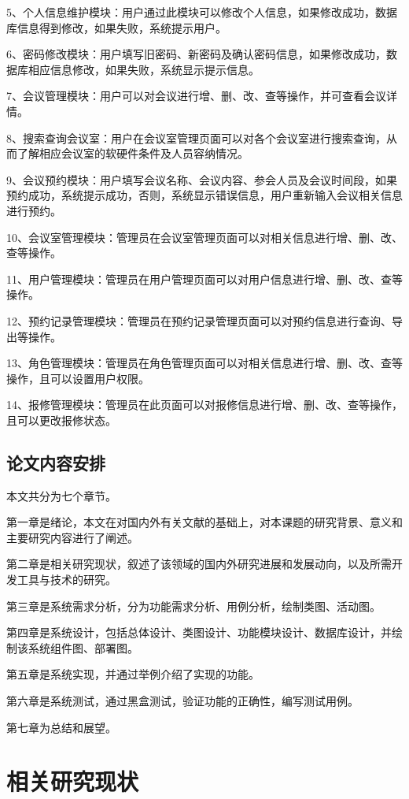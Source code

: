 \documentclass{izdthesis}
\begin{document}
5、个人信息维护模块：用户通过此模块可以修改个人信息，如果修改成功，数据库信息得到修改，如果失败，系统提示用户。

6、密码修改模块：用户填写旧密码、新密码及确认密码信息，如果修改成功，数据库相应信息修改，如果失败，系统显示提示信息。

7、会议管理模块：用户可以对会议进行增、删、改、查等操作，并可查看会议详情。

8、搜索查询会议室：用户在会议室管理页面可以对各个会议室进行搜索查询，从而了解相应会议室的软硬件条件及人员容纳情况。

9、会议预约模块：用户填写会议名称、会议内容、参会人员及会议时间段，如果预约成功，系统提示成功，否则，系统显示错误信息，用户重新输入会议相关信息进行预约。

10、会议室管理模块：管理员在会议室管理页面可以对相关信息进行增、删、改、查等操作。

11、用户管理模块：管理员在用户管理页面可以对用户信息进行增、删、改、查等操作。

12、预约记录管理模块：管理员在预约记录管理页面可以对预约信息进行查询、导出等操作。

13、角色管理模块：管理员在角色管理页面可以对相关信息进行增、删、改、查等操作，且可以设置用户权限。

14、报修管理模块：管理员在此页面可以对报修信息进行增、删、改、查等操作，且可以更改报修状态。

\section{论文内容安排}
本文共分为七个章节。

第一章是绪论，本文在对国内外有关文献的基础上，对本课题的研究背景、意义和主要研究内容进行了阐述。

第二章是相关研究现状，叙述了该领域的国内外研究进展和发展动向，以及所需开发工具与技术的研究。

第三章是系统需求分析，分为功能需求分析、用例分析，绘制类图、活动图。

第四章是系统设计，包括总体设计、类图设计、功能模块设计、数据库设计，并绘制该系统组件图、部署图。

第五章是系统实现，并通过举例介绍了实现的功能。

第六章是系统测试，通过黑盒测试，验证功能的正确性，编写测试用例。

第七章为总结和展望。

\chapter{相关研究现状}
\end{document}
